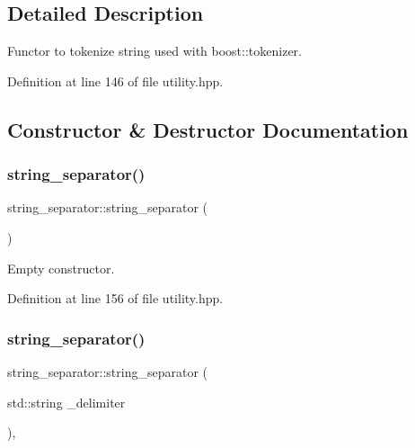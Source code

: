 \subsection{Detailed Description}
Functor to tokenize string used with boost\+::tokenizer. 

Definition at line 146 of file utility.\+hpp.



\subsection{Constructor \& Destructor Documentation}
\mbox{\label{classstring__separator_ad337bb516414fe7a759aba7bbd7fe57e}} 
\subsubsection{\texorpdfstring{string\+\_\+separator()}{string\_separator()}\hspace{0.1cm}{\footnotesize\ttfamily [1/2]}}
{\footnotesize\ttfamily string\+\_\+separator\+::string\+\_\+separator (\begin{DoxyParamCaption}{ }\end{DoxyParamCaption})\hspace{0.3cm}{\ttfamily [inline]}}



Empty constructor. 



Definition at line 156 of file utility.\+hpp.

\mbox{\label{classstring__separator_abf0db07e243f7b35acc759707463b88d}} 
\subsubsection{\texorpdfstring{string\+\_\+separator()}{string\_separator()}\hspace{0.1cm}{\footnotesize\ttfamily [2/2]}}
{\footnotesize\ttfamily string\+\_\+separator\+::string\+\_\+separator (\begin{DoxyParamCaption}\item[{std\+::string}]{\+\_\+delimiter }\end{DoxyParamCaption})\hspace{0.3cm}{\ttfamily [inline]}, {\ttfamily [explicit]}}




